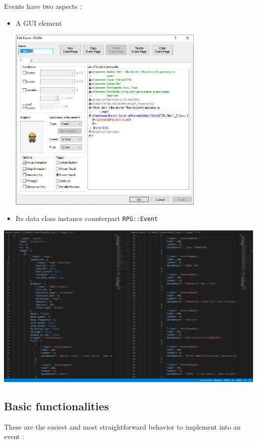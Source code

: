\documentclass[11pt]{article}
\begin{document}
Events have two aspects :
\begin{itemize}
	\item A GUI element
	\vspace{2mm}
	\begin{center}
		\includegraphics[width=0.75\textwidth]{Event} 
	\end{center}
	\newpage
	\item Its data class instance counterpart \verb|RPG::Event|
	
	
\end{itemize}
\includegraphics[width=\textwidth]{Event_json}


\subsection{Basic functionalities}

These are the easiest and most straightforward behavior to implement into an event :
\end{document}
